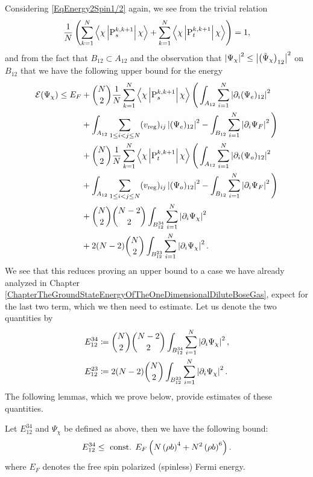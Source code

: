 Considering \eqref{EqEnergy2Spin1/2} again, we see from the trivial relation $$
\frac{1}{N}\left(\sum_{k=1}^{N} \left\langle\chi \left\lvert \operatorname{P}^{k,k+1}_s  \right\rvert \chi\right\rangle+\sum_{k=1}^{N}\left\langle\chi \left\lvert \operatorname{P}^{k,k+1}_t  \right\rvert \chi\right\rangle\right)=1,
$$
and from the fact that $ B_{12}\subset A_{12} $ and the observation that $ \left\lvert \Psi_{\chi} \right\rvert^2\leq \left\lvert \left(\tilde{\Psi}_{\chi}\right)_{12} \right\rvert^2 $ on $ B_{12} $ that we have the following upper bound for the energy\begin{equation}\label{EqTrialStateEnergyUpperBound1}
	\begin{aligned}
	\mathcal{E}(\Psi_{\chi})\leq E_F&+\binom{N}{2}\frac{1}{N}\sum_{k=1}^{N}\left\langle\chi \left\lvert \operatorname{P}^{k,k+1}_s  \right\rvert \chi\right\rangle\Bigg(\int_{A_{12}}\sum_{i=1}^{N}\left\lvert \partial_i(\Psi_e)_{12} \right\rvert^2\\
	&+\int_{A_{12}}\sum_{1\leq i<j\leq N}(v_{\text{reg}})_{ij}\left\lvert (\Psi_e)_{12} \right\rvert^2-\int_{B_{12}}\sum_{i=1}^{N}\left\lvert \partial_i \Psi_F \right\rvert^2\Bigg)\\
	&+\binom{N}{2}\frac{1}{N}\sum_{k=1}^{N}\left\langle\chi \left\lvert \operatorname{P}^{k,k+1}_t  \right\rvert \chi\right\rangle\Bigg(\int_{A_{12}}\sum_{i=1}^{N}\left\lvert \partial_i(\Psi_o)_{12} \right\rvert^2\\
	&+\int_{A_{12}}\sum_{1\leq i<j\leq N}(v_{\text{reg}})_{ij}\left\lvert (\Psi_o)_{12} \right\rvert^2-\int_{B_{12}}\sum_{i=1}^{N}\left\lvert \partial_i \Psi_F \right\rvert^2\Bigg)\\
	&+\binom{N}{2}\binom{N-2}{2}\int_{B_{12}^{34}}\sum_{i=1}^{N}\left\lvert \partial_i\Psi_{\chi} \right\rvert^2\\
	&+2(N-2)\binom{N}{2}\int_{B_{12}^{23}}\sum_{i=1}^{N}\left\lvert \partial_i\Psi_{\chi} \right\rvert^2.
	\end{aligned}
\end{equation}
We see that this reduces proving an upper bound to a case we have already analyzed in Chapter \ref{ChapterTheGroundStateEnergyOfTheOneDimensionalDiluteBoseGas}, expect for the last two term, which we then need to estimate. Let us denote the two quantities by \begin{equation}
\begin{aligned}
E_{12}^{34}&\coloneqq\binom{N}{2}\binom{N-2}{2}\int_{B_{12}^{34}}\sum_{i=1}^{N}\left\lvert \partial_i\Psi_{\chi} \right\rvert^2,\\
E_{12}^{23}&\coloneqq 2(N-2)\binom{N}{2}\int_{B_{12}^{23}}\sum_{i=1}^{N}\left\lvert \partial_i\Psi_{\chi} \right\rvert^2.
\end{aligned}
\end{equation} 
The following lemmas, which we prove below, provide estimates of these quantities.
\begin{lemma}\label{LemmaSpin1/2EtaContribution1}
	Let $ E_{12}^{34} $ and $ \Psi_{\chi} $ be defined as above, then we have the following bound:\begin{equation}
	E_{12}^{34}\leq \textnormal{ const. } E_F\left(N\left(\rho b\right)^4+N^2\left(\rho b\right)^6 \right).
	\end{equation}
	where $ E_F $ denotes the free spin polarized (spinless) Fermi energy.
\end{lemma}

